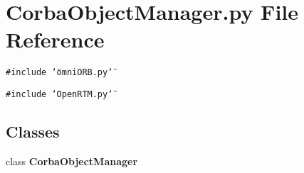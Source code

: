 \section{Corba\-Object\-Manager.py File Reference}
\label{CorbaObjectManager_8py}
{\tt \#include \char`\"{}omni\-ORB.py\char`\"{}}\par
{\tt \#include \char`\"{}Open\-RTM.py\char`\"{}}\par
\subsection*{Classes}
\begin{CompactItemize}
\item 
class {\bf Corba\-Object\-Manager}
\end{CompactItemize}
